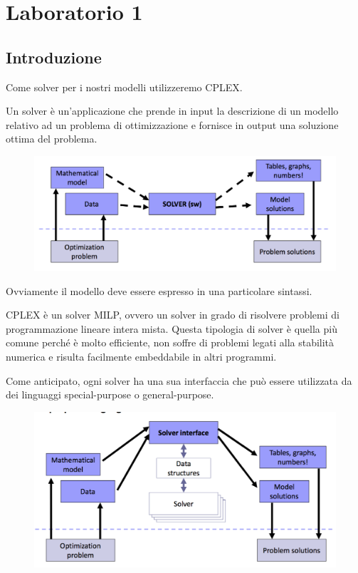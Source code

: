 
\chapter{Laboratorio 1}

\section{Introduzione}

Come solver per i nostri modelli utilizzeremo CPLEX.

Un solver è un'applicazione che prende in input la descrizione di un modello relativo ad un problema di ottimizzazione e fornisce in output una soluzione ottima del problema.

\begin{figure}[htbp]
	\centering
	\includegraphics[width=0.7\linewidth]{./images/lab1-schema-1}
\end{figure}

Ovviamente il modello deve essere espresso in una particolare sintassi.

CPLEX è un solver MILP, ovvero un solver in grado di risolvere problemi di programmazione lineare intera mista.
Questa tipologia di solver è quella più comune perché è molto efficiente, non soffre di problemi legati alla stabilità numerica e risulta facilmente embeddabile in altri programmi.

Come anticipato, ogni solver ha una sua interfaccia che può essere utilizzata da dei linguaggi special-purpose o general-purpose.

\begin{figure}[htbp]
	\centering
	\includegraphics[width=0.7\linewidth]{./images/lab1-schema-2}
\end{figure}


